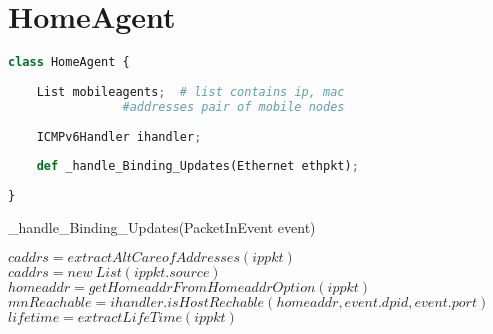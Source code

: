 \documentclass[10pt,a4paper,titlepage]{report}
\begin{document}

\section{HomeAgent}
\begin{lstlisting}[language=Python]
class HomeAgent {
	
	List mobileagents;	# list contains ip, mac 
				#addresses pair of mobile nodes
	
	ICMPv6Handler ihandler;
	
	def _handle_Binding_Updates(Ethernet ethpkt);
	
}
\end{lstlisting}

\begin{algorithm}
	\caption{\_handle\_Binding\_Updates(PacketInEvent event)}
	\begin{algorithmic}
			\STATE $caddrs = extractAltCareofAddresses(ippkt)$
		\ELSE 
			\STATE $caddrs = new\ List(ippkt.source)$
		\ENDIF
		\STATE $homeaddr = getHomeaddrFromHomeaddrOption(ippkt)$
		\STATE $mnReachable = ihandler.isHostRechable(homeaddr, event.dpid, event.port)$
		\STATE $lifetime = extractLifeTime(ippkt)$
	\end{algorithmic}
\end{algorithm}
\end{document}
